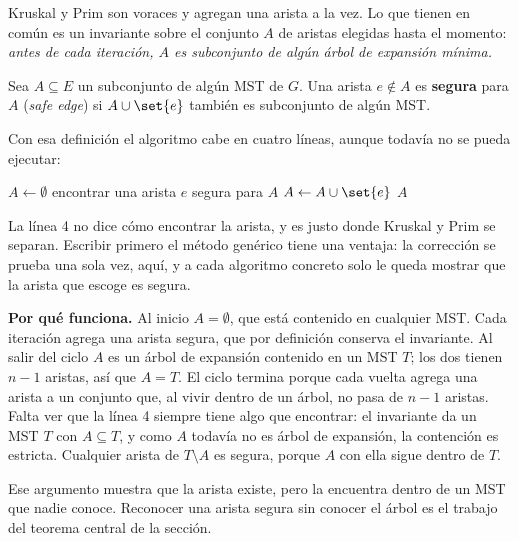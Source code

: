 \documentclass[11pt,letterpaper]{article}
\begin{document}
Kruskal y Prim son voraces y agregan una arista a la vez. Lo que
tienen en común es un invariante sobre el conjunto $A$ de aristas
elegidas hasta el momento: \emph{antes de cada iteración, $A$ es
subconjunto de algún árbol de expansión mínima.}

\begin{definicion}
  \label{def:arista-segura-mst}
  Sea $A \subseteq E$ un subconjunto de algún MST de $G$. Una arista
  $e \notin A$ es \textbf{segura} para $A$ (\textit{safe edge}) si
  $A \cup \set{e}$ también es subconjunto de algún MST.
\end{definicion}

Con esa definición el algoritmo cabe en cuatro líneas, aunque todavía
no se pueda ejecutar:

\begin{algorithm}[H]
\caption{\textsc{MST-Genérico}$(G, w)$}
\label{alg:mst-generico}
\begin{algorithmic}[1]
  \State $A \gets \emptyset$
    \State encontrar una arista $e$ segura para $A$
    \State $A \gets A \cup \set{e}$
  \EndWhile
  \State \Return $A$
\EndProcedure
\end{algorithmic}
\end{algorithm}

La línea 4 no dice cómo encontrar la arista, y es justo donde Kruskal
y Prim se separan. Escribir primero el método genérico tiene una
ventaja: la corrección se prueba una sola vez, aquí, y a cada
algoritmo concreto solo le queda mostrar que la arista que escoge es
segura.

\textbf{Por qué funciona.} Al inicio $A = \emptyset$, que está
contenido en cualquier MST. Cada iteración agrega una arista segura,
que por definición conserva el invariante. Al salir del ciclo $A$ es
un árbol de expansión contenido en un MST $T$; los dos tienen $n - 1$
aristas, así que $A = T$. El ciclo termina porque cada vuelta agrega
una arista a un conjunto que, al vivir dentro de un árbol, no pasa de
$n - 1$ aristas. Falta ver que la línea 4 siempre tiene algo que
encontrar: el invariante da un MST $T$ con $A \subseteq T$, y como $A$
todavía no es árbol de expansión, la contención es estricta. Cualquier
arista de $T \setminus A$ es segura, porque $A$ con ella sigue dentro
de $T$.

Ese argumento muestra que la arista existe, pero la encuentra dentro
de un MST que nadie conoce. Reconocer una arista segura sin conocer el
árbol es el trabajo del teorema central de la sección.
\end{document}
